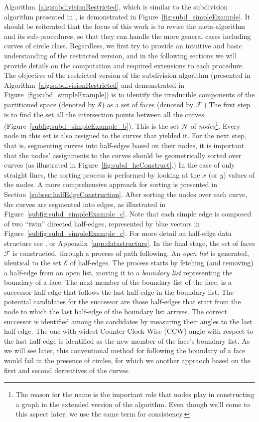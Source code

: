 Algorithm~\ref{alg:subdivisionRestricted}, which is similar to the subdivision algorithm presented in \cite{de2000computational}, is demonstrated in Figure~\ref{fig:subd_simpleExample}.
It should be reiterated that the focus of this work is to revise the meta-algorithm and its sub-procedures, so that they can handle the more general cases including curves of circle class.
Regardless, we first try to provide an intuitive and basic understanding of the restricted version, and in the following sections we will provide details on the computation and required extensions to each procedure.
The objective of the restricted version of the subdivision algorithm (presented in Algorithm~\ref{alg:subdivisionRestricted} and demonstrated in Figure~\ref{fig:subd_simpleExample}) is to identify the irreducible components of the partitioned space (denoted by $\mathcal{S}$) as a set of faces (denoted by $\mathcal{F}$.)
The first step is to find the set all the intersection points between all the curves (Figure~\ref{subfig:subd_simpleExample_b}).
This is the set $\mathcal{N}$ of \emph{nodes}\footnote{The reason for the name is the important role that nodes play in constructing a graph in the extended version of the algorithm. Even though we'll come to this aspect later, we use the same term for consistency.}.
Every node in this set is also assigned to the curves that yielded it.
For the next step, that is, segmenting curves into half-edges based on their nodes, it is important that the nodes' assignments to the curves should be geometrically sorted over curves (as illustrated in Figure~\ref{fig:subd_heConstruct}.)
In the case of only straight lines, the sorting process is performed by looking at the $x$ (or $y$) values of the nodes.
A more comprehensive approach for sorting is presented in Section~\ref{subsec:halfEdgeConstruction}.
After sorting the nodes over each curve, the curves are segmented into edges, as illustrated in Figure~\ref{subfig:subd_simpleExample_c}.
Note that each simple edge is composed of two ``twin'' directed half-edges, represented by blue vectors in Figure~\ref{subfig:subd_simpleExample_c}.
For more detail on half-edge data structure see \cite{de2000computational}, or Appendix~\ref{app:datastructure}.
In the final stage, the set of faces $\mathcal{F}$ is constructed, through a process of path following.
An \emph{open list} is generated, identical to the set $\mathcal{E}$ of half-edges.
The process starts by fetching (and removing) a half-edge from an open list, moving it to a \emph{boundary list} representing the boundary of a face.
The next member of the boundary list of the face, is a successor half-edge that follows the last half-edge in the boundary list.
The potential candidates for the successor are those half-edges that start from the node to which the last half-edge of the boundary list arrives.
The correct successor is identified among the candidates by measuring their angles to the last half-edge.
The one with widest Counter Clock-Wise (CCW) angle with respect to the last half-edge is identified as the new member of the face's boundary list.
As we will see later, this conventional method for following the boundary of a face would fail in the presence of circles, for which we another appraoch based on the first and second derivatives of the curves.


